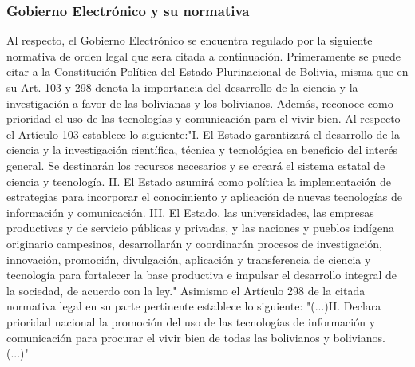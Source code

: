 \subsubsection{Gobierno Electrónico y su normativa}
Al respecto, el Gobierno Electrónico se encuentra regulado por la siguiente normativa de orden legal que sera citada a continuación. Primeramente se puede citar a la Constitución Política del Estado Plurinacional de Bolivia, misma que en su Art. 103 y 298 denota la importancia del desarrollo de la ciencia y la investigación a favor de las bolivianas y los bolivianos. Además, reconoce como prioridad el uso de las tecnologías y comunicación para el vivir bien. Al respecto el Artículo 103 establece lo siguiente:"I. El Estado garantizará el desarrollo de la ciencia y la investigación científica, técnica y tecnológica en beneficio del interés general. Se destinarán los recursos necesarios y se creará el sistema estatal de ciencia y tecnología. II. El Estado asumirá como política la implementación de estrategias para incorporar el conocimiento y aplicación de nuevas tecnologías de información y comunicación. III. El Estado, las universidades, las empresas productivas y de servicio públicas y privadas, y las naciones y pueblos indígena originario campesinos, desarrollarán y coordinarán procesos de investigación, innovación, promoción, divulgación, aplicación y transferencia de ciencia y tecnología para fortalecer la base productiva e impulsar el desarrollo integral de la sociedad, de acuerdo con la ley." Asimismo el Artículo 298 de la citada normativa legal en su parte pertinente establece lo siguiente: "(...)II. Declara prioridad nacional la promoción del uso de las tecnologías de información y comunicación para procurar el vivir bien de todas las bolivianos y bolivianos. (...)"
